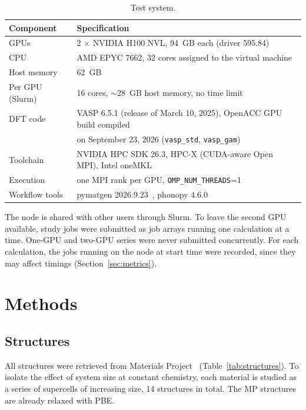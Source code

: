 \documentclass[11pt,letterpaper]{article}
\begin{document}
\begin{table}[htbp]
\centering
\caption{Test system.}
\label{tab:hardware}
\small
\begin{tabular}{@{}ll@{}}
\toprule
Component & Specification \\
\midrule
GPUs & 2 $\times$ NVIDIA H100 NVL, \SI{94}{GB} each (driver 595.84) \\
CPU & AMD EPYC 7662, 32 cores assigned to the virtual machine \\
Host memory & \SI{62}{GB} \\
Per GPU (Slurm) & 16 cores, $\sim$\SI{28}{GB} host memory, no time limit \\
DFT code & VASP 6.5.1 (release of March 10, 2025), OpenACC GPU build compiled \\
         & on September 23, 2026 (\texttt{vasp\_std}, \texttt{vasp\_gam}) \\
Toolchain & NVIDIA HPC SDK 26.3, HPC-X (CUDA-aware Open MPI), Intel oneMKL \\
Execution & one MPI rank per GPU, \texttt{OMP\_NUM\_THREADS}=1 \\
Workflow tools & pymatgen 2026.9.23~\cite{Ong2013}, phonopy 4.6.0~\cite{Togo2023,Togo2015} \\
\bottomrule
\end{tabular}
\end{table}

The node is shared with other users through Slurm. To leave the second GPU available, study jobs
were submitted as job arrays running one calculation at a time. One-GPU and two-GPU series were
never submitted concurrently. For each
calculation, the jobs running on the node at start time were recorded, since they may affect
timings (Section~\ref{sec:metrics}).

\section{Methods}
\label{sec:methods}

\subsection{Structures}
\label{sec:structures}

All structures were retrieved from Materials Project~\cite{Jain2013} (Table~\ref{tab:structures}).
To isolate the effect of system size at constant chemistry, each material is studied as a series
of supercells of increasing size, 14 structures in total. The MP structures are already relaxed
with PBE.
\end{document}
